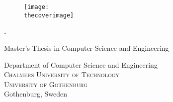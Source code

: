 
\newcommand{\oneLineTitle}{\thetitle}
\newcommand{\multiLineTitle}[1]{\thetitle}

\begin{titlepage}

\addtolength{\voffset}{2cm}

\ifdefined\thecoverimage
\begin{figure}[H]
\centering
\vspace{1cm}
\texttt{[image: \\thecoverimage]}
\end{figure}
\else
\vspace{1cm}
\fi

\setlength{\parindent}{0cm}
\setlength{\parskip}{0cm}

\mbox{}
\vfill
{\sf
  \textbf{\Huge .\multiLineTitle} \vspace{\baselineskip}\vspace{0.5cm}

  \ifdefined\thesubtitle
  {\Large \thesubtitle}  \vspace{\baselineskip}\vspace{0.5cm}
  \fi

  Master's Thesis in Computer Science and Engineering

  \vspace{1em}

  {\Large \theauthor}

  \vspace{2.9cm}

  Department of Computer Science and Engineering \\
  {\normalfont \textsc{Chalmers University of Technology}} \\
  {\normalfont \textsc{University of Gothenburg}} \\
  Gothenburg, Sweden \the\year
}

\end{titlepage}


\newpage
\restoregeometry
\thispagestyle{empty}
\mbox{}


